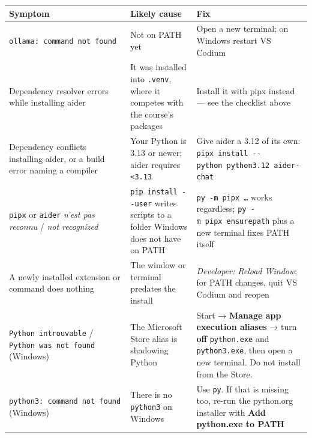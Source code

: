 \documentclass[
  letterpaper,
  10pt,
  twoside,
  openright,
  numbers=noenddot,
  chapterprefix=true]{scrbook}
\begin{document}
\begin{longtable}[]{@{}
  >{\raggedright\arraybackslash}p{}
  >{\raggedright\arraybackslash}p{}
  >{\raggedright\arraybackslash}p{}@{}}
\toprule\noalign{}
\begin{minipage}[b]{\linewidth}\raggedright
Symptom
\end{minipage} & \begin{minipage}[b]{\linewidth}\raggedright
Likely cause
\end{minipage} & \begin{minipage}[b]{\linewidth}\raggedright
Fix
\end{minipage} \\
\midrule\noalign{}
\endhead
\bottomrule\noalign{}
\endlastfoot
\texttt{ollama:\ command\ not\ found} & Not on PATH yet & Open a new
terminal; on Windows restart VS Codium \\
Dependency resolver errors while installing aider & It was installed
into \texttt{.venv}, where it competes with the course's packages &
Install it with pipx instead --- see the checklist above \\
Dependency conflicts installing aider, or a build error naming a
compiler & Your Python is 3.13 or newer; aider requires
\texttt{\textless{}3.13} & Give aider a 3.12 of its own:
\texttt{pipx\ install\ -\/-python\ python3.12\ aider-chat} \\
\texttt{pipx} or \texttt{aider} \emph{n'est pas reconnu} / \emph{not
recognized} & \texttt{pip\ install\ -\/-user} writes scripts to a folder
Windows does not have on PATH & \texttt{py\ -m\ pipx\ …} works
regardless; \texttt{py\ -m\ pipx\ ensurepath} plus a new terminal fixes
PATH itself \\
A newly installed extension or command does nothing & The window or
terminal predates the install & \emph{Developer: Reload Window}; for
PATH changes, quit VS Codium and reopen \\
\texttt{Python\ introuvable} / \texttt{Python\ was\ not\ found}
(Windows) & The Microsoft Store alias is shadowing Python & Start →
\textbf{Manage app execution aliases} → turn \textbf{off}
\texttt{python.exe} and \texttt{python3.exe}, then open a new terminal.
Do not install from the Store. \\
\texttt{python3:\ command\ not\ found} (Windows) & There is no
\texttt{python3} on Windows & Use \texttt{py}. If that is missing too,
re-run the python.org installer with \textbf{Add python.exe to PATH}

\end{longtable}
\end{document}
